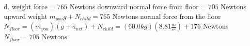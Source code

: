 d. weight force = $765$ Newtons downward   normal force from floor = $705$ Newtons upward\newline
weight $m_{you}g + N_{child} = 765$ Newtons\newline
normal force from the floor $N_{floor} = (m_{you})(g + a_{net}) + N_{child} = (60.0 kg)(8.81 \frac{m}{s^{2}}) + 176$ Newtons
$N_{floor} = 705$ Newtons


